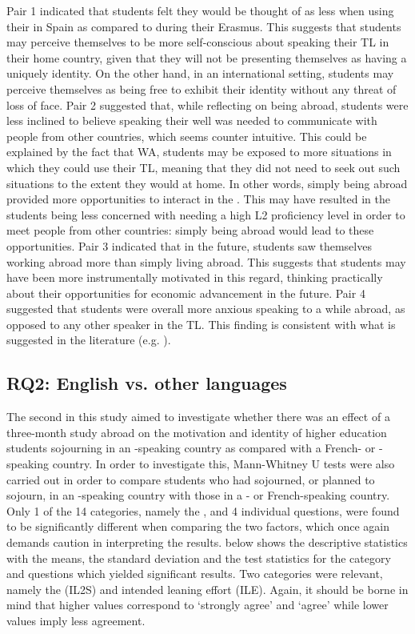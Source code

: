 \documentclass[output=paper]{langsci/langscibook}
\begin{document}
Pair 1 indicated that students felt they would be thought of as less  when using their  in Spain as compared to during their Erasmus. This suggests that students may perceive themselves to be more self-conscious about speaking their TL in their home country, given that they will not be presenting themselves as having a uniquely  identity. On the other hand, in an international setting, students may perceive themselves as being free to exhibit their  identity without any threat of loss of face. Pair 2 suggested that, while reflecting on being abroad, students were less inclined to believe speaking their  well was needed to communicate with people from other countries, which seems counter intuitive. This could be explained by the fact that WA, students may be exposed to more situations in which they could use their TL, meaning that they did not need to seek out such situations to the extent they would at home. In other words, simply being abroad provided more opportunities to interact in the . This may have resulted in the students being less concerned with needing a high L2 proficiency level in order to meet people from other countries: simply being abroad would lead to these opportunities. Pair 3 indicated that in the future, students saw themselves working abroad more than simply living abroad. This suggests that students may have been more instrumentally motivated in this regard, thinking practically about their opportunities for economic advancement in the future. Pair 4 suggested that students were overall more anxious speaking to a  while abroad, as opposed to any other speaker in the TL. This finding is consistent with what is suggested in the literature (e.g. \citealt{Woodrow2006}).

 
\subsection{RQ2: English vs. other languages}


The second  in this study aimed to investigate whether there was an effect of a three-month study abroad on the motivation and identity of higher education students sojourning in an -speaking country as compared with a French- or -speaking country. In order to investigate this, Mann-Whitney U tests were also carried out in order to compare students who had sojourned, or planned to sojourn, in an -speaking country with those in a - or French-speaking country. Only 1 of the 14 categories, namely the , and 4 individual questions, were found to be significantly different when comparing the two factors, which once again demands caution in interpreting the results.  below shows the descriptive statistics with the means, the standard deviation and the test statistics for the category and questions which yielded significant results. Two categories were relevant, namely the  (IL2S) and intended leaning effort (ILE). Again, it should be borne in mind that higher values correspond to ‘strongly agree’ and ‘agree’ while lower values imply less agreement.
\end{document}
